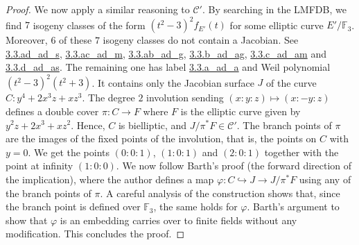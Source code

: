 \documentclass[11pt]{amsart}
\newcommand\F{\mathbb{F}}
\newcommand\cC{\mathcal{C}}
\theoremstyle{plain}
\theoremstyle{definition}
\begin{document}
\begin{proof}
    We now apply a similar reasoning to $\cC'$.
    By searching in the LMFDB, we find $7$ isogeny classes of the form $(t^2-3)^2 f_{E'}(t)$ for some elliptic curve $E'/\F_3$.
    Moreover, $6$ of these $7$ isogeny classes do not contain a Jacobian.
    See 
    \href{http://www.lmfdb.org/Variety/Abelian/Fq/3/3/ad_ad_s}{3.3.ad\_ad\_s},
    \href{http://www.lmfdb.org/Variety/Abelian/Fq/3/3/ac_ad_m}{3.3.ac\_ad\_m},
    \href{http://www.lmfdb.org/Variety/Abelian/Fq/3/3/ab_ad_g}{3.3.ab\_ad\_g},
    \href{http://www.lmfdb.org/Variety/Abelian/Fq/3/3/b_ad_ag}{3.3.b\_ad\_ag},
    \href{http://www.lmfdb.org/Variety/Abelian/Fq/3/3/c_ad_am}{3.3.c\_ad\_am} and
    \href{http://www.lmfdb.org/Variety/Abelian/Fq/3/3/d_ad_as}{3.3.d\_ad\_as}.
    The remaining one has label
    \href{http://www.lmfdb.org/Variety/Abelian/Fq/3/3/a_ad_a}{3.3.a\_ad\_a} and
    Weil polynomial $(t^2-3)^2(t^2+3)$.
    It contains only the Jacobian surface $J$ of the curve $C:y^4+2x^3z+xz^3$.
    The degree $2$ 
    involution sending $(x:y:z)\mapsto (x:-y:z)$  defines a double cover $\pi:C\to F$ where $F$ is the elliptic curve given by $y^2z+2x^3+xz^2$.
    Hence, $C$ is bielliptic, and
    $J/\pi^* F \in \cC'$. 
    The branch points of $\pi$ are the images of the fixed points of the involution, that is, the points on $C$ with $y=0$.
    We get the points $(0:0:1)$, $(1:0:1)$ and $(2:0:1)$ together with the point at infinity $(1:0:0)$. 
    We now follow Barth's proof \cite[Prop. 1.8]{Barth} (the forward direction of the implication),
    where the author defines a map $\varphi: C \hookrightarrow J \to J/\pi^* F$ using any of the branch points of $\pi$.
    A careful analysis of the construction shows that, since the branch point is defined over $\F_3$, the same holds for $\varphi$.
    Barth's argument to show that $\varphi$ is an embedding carries over to finite fields without any modification.
    This concludes the proof.
   \end{proof}
\end{document}
